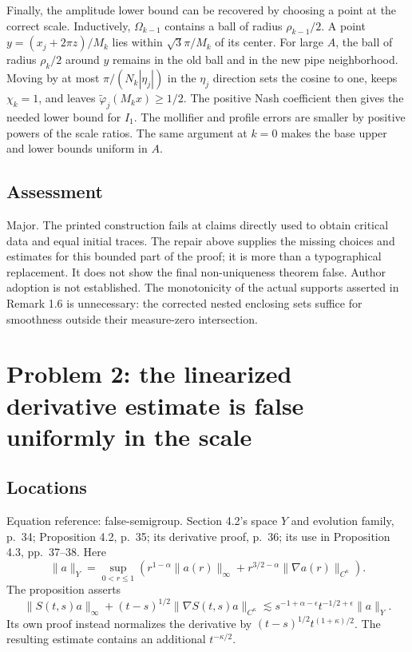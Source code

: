 \documentclass[10pt]{article}
\begin{document}
Finally, the amplitude lower bound can be recovered by choosing a point at the correct scale. Inductively, \(\Omega_{k-1}\) contains a ball of radius \(\rho_{k-1}/2\). A point \(y=(x_j+2\pi z)/M_k\) lies within \(\sqrt3\pi/M_k\) of its center. For large \(A\), the ball of radius \(\rho_k/2\) around \(y\) remains in the old ball and in the new pipe neighborhood. Moving by at most \(\pi/(N_k|\eta_j|)\) in the \(\eta_j\) direction sets the cosine to one, keeps \(\chi_k=1\), and leaves \(\widetilde\varphi_j(M_kx)\geq1/2\). The positive Nash coefficient then gives the needed lower bound for \(I_1\). The mollifier and profile errors are smaller by positive powers of the scale ratios. The same argument at \(k=0\) makes the base upper and lower bounds uniform in \(A\).\par
\subsection*{Assessment}
Major. The printed construction fails at claims directly used to obtain critical data and equal initial traces. The repair above supplies the missing choices and estimates for this bounded part of the proof; it is more than a typographical replacement. It does not show the final non-uniqueness theorem false. Author adoption is not established. The monotonicity of the actual supports asserted in Remark 1.6 is unnecessary: the corrected nested enclosing sets suffice for smoothness outside their measure-zero intersection.\par
\section*{Problem 2: the linearized derivative estimate is false uniformly in the scale}
\subsection*{Locations}
Equation reference: false-semigroup. Section 4.2’s space \(Y\) and evolution family, p. 34; Proposition 4.2, p. 35; its derivative proof, p. 36; its use in Proposition 4.3, pp. 37–38. Here \[\|a\|_Y=\sup_{0<r\leq1}
 \left(r^{1-\alpha}\|a(r)\|_\infty
       +r^{3/2-\alpha}\|\nabla a(r)\|_{C^\kappa}\right).\] The proposition asserts \[
 \|S(t,s)a\|_\infty+(t-s)^{1/2}\|\nabla S(t,s)a\|_{C^\kappa}
 \lesssim s^{-1+\alpha-\epsilon}t^{-1/2+\epsilon}\|a\|_Y.\] Its own proof instead normalizes the derivative by \((t-s)^{1/2}t^{(1+\kappa)/2}\). The resulting estimate contains an additional \(t^{-\kappa/2}\).\par
\end{document}
